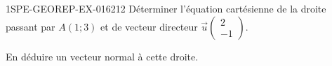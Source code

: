\begin{exercice}{1SPE-GEOREP-EX-016}{2}{12}
Déterminer l'équation cartésienne de la droite passant par $A(1 ; 3)$ et de vecteur directeur $\vec{u}\begin{pmatrix} 2 \\ -1 \end{pmatrix}$.

En déduire un vecteur normal à cette droite.
\end{exercice}

